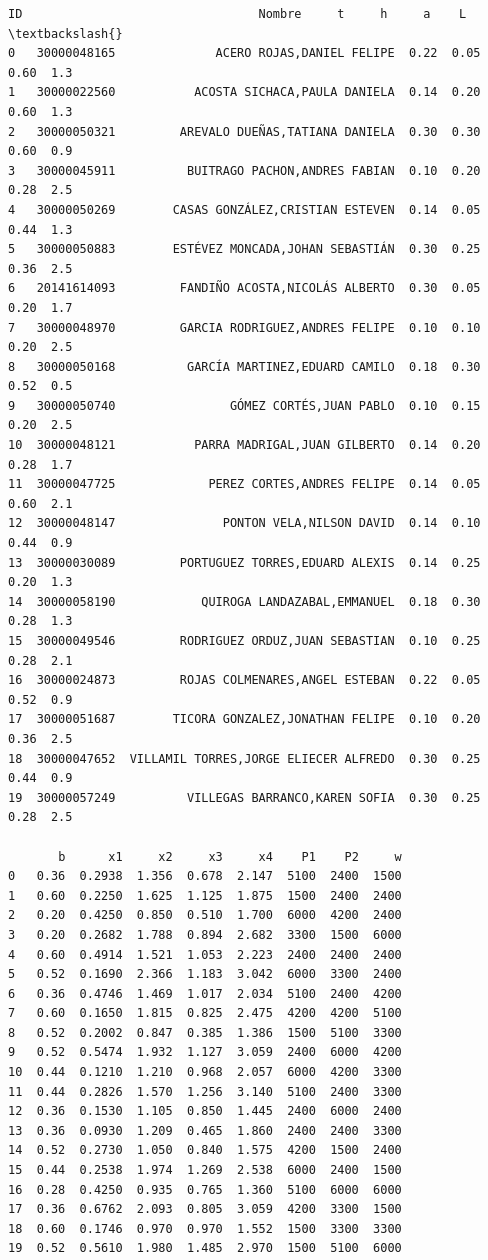 \documentclass[11pt]{article}
\makeatletter
\newcommand{\boxspacing}{\kern\kvtcb@left@rule\kern\kvtcb@boxsep}
\newcommand{\prompt}[4]{
        {\ttfamily\llap{{\color{#2}[#3]:\hspace{3pt}#4}}\vspace{-\baselineskip}}
    }
\makeatother
\begin{document}
            \begin{tcolorbox}[breakable, size=fbox, boxrule=.5pt, pad at break*=1mm, opacityfill=0]
\prompt{Out}{outcolor}{2}{\boxspacing}
\begin{Verbatim}[commandchars=\\\{\}]
             ID                                 Nombre     t     h     a    L  \textbackslash{}
0   30000048165              ACERO ROJAS,DANIEL FELIPE  0.22  0.05  0.60  1.3
1   30000022560           ACOSTA SICHACA,PAULA DANIELA  0.14  0.20  0.60  1.3
2   30000050321         AREVALO DUEÑAS,TATIANA DANIELA  0.30  0.30  0.60  0.9
3   30000045911          BUITRAGO PACHON,ANDRES FABIAN  0.10  0.20  0.28  2.5
4   30000050269        CASAS GONZÁLEZ,CRISTIAN ESTEVEN  0.14  0.05  0.44  1.3
5   30000050883        ESTÉVEZ MONCADA,JOHAN SEBASTIÁN  0.30  0.25  0.36  2.5
6   20141614093         FANDIÑO ACOSTA,NICOLÁS ALBERTO  0.30  0.05  0.20  1.7
7   30000048970         GARCIA RODRIGUEZ,ANDRES FELIPE  0.10  0.10  0.20  2.5
8   30000050168          GARCÍA MARTINEZ,EDUARD CAMILO  0.18  0.30  0.52  0.5
9   30000050740                GÓMEZ CORTÉS,JUAN PABLO  0.10  0.15  0.20  2.5
10  30000048121           PARRA MADRIGAL,JUAN GILBERTO  0.14  0.20  0.28  1.7
11  30000047725             PEREZ CORTES,ANDRES FELIPE  0.14  0.05  0.60  2.1
12  30000048147               PONTON VELA,NILSON DAVID  0.14  0.10  0.44  0.9
13  30000030089         PORTUGUEZ TORRES,EDUARD ALEXIS  0.14  0.25  0.20  1.3
14  30000058190            QUIROGA LANDAZABAL,EMMANUEL  0.18  0.30  0.28  1.3
15  30000049546         RODRIGUEZ ORDUZ,JUAN SEBASTIAN  0.10  0.25  0.28  2.1
16  30000024873         ROJAS COLMENARES,ANGEL ESTEBAN  0.22  0.05  0.52  0.9
17  30000051687        TICORA GONZALEZ,JONATHAN FELIPE  0.10  0.20  0.36  2.5
18  30000047652  VILLAMIL TORRES,JORGE ELIECER ALFREDO  0.30  0.25  0.44  0.9
19  30000057249          VILLEGAS BARRANCO,KAREN SOFIA  0.30  0.25  0.28  2.5

       b      x1     x2     x3     x4    P1    P2     w
0   0.36  0.2938  1.356  0.678  2.147  5100  2400  1500
1   0.60  0.2250  1.625  1.125  1.875  1500  2400  2400
2   0.20  0.4250  0.850  0.510  1.700  6000  4200  2400
3   0.20  0.2682  1.788  0.894  2.682  3300  1500  6000
4   0.60  0.4914  1.521  1.053  2.223  2400  2400  2400
5   0.52  0.1690  2.366  1.183  3.042  6000  3300  2400
6   0.36  0.4746  1.469  1.017  2.034  5100  2400  4200
7   0.60  0.1650  1.815  0.825  2.475  4200  4200  5100
8   0.52  0.2002  0.847  0.385  1.386  1500  5100  3300
9   0.52  0.5474  1.932  1.127  3.059  2400  6000  4200
10  0.44  0.1210  1.210  0.968  2.057  6000  4200  3300
11  0.44  0.2826  1.570  1.256  3.140  5100  2400  3300
12  0.36  0.1530  1.105  0.850  1.445  2400  6000  2400
13  0.36  0.0930  1.209  0.465  1.860  2400  2400  3300
14  0.52  0.2730  1.050  0.840  1.575  4200  1500  2400
15  0.44  0.2538  1.974  1.269  2.538  6000  2400  1500
16  0.28  0.4250  0.935  0.765  1.360  5100  6000  6000
17  0.36  0.6762  2.093  0.805  3.059  4200  3300  1500
18  0.60  0.1746  0.970  0.970  1.552  1500  3300  3300
19  0.52  0.5610  1.980  1.485  2.970  1500  5100  6000
\end{Verbatim}
\end{tcolorbox}
        
\end{document}
